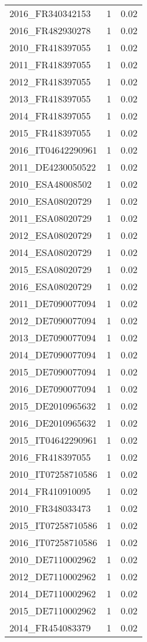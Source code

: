 \begin{table*}[htbp]
\begin{tabular}{lrr}
2016_FR340342153 & 1 & 0.02 \\
2016_FR482930278 & 1 & 0.02 \\
2010_FR418397055 & 1 & 0.02 \\
2011_FR418397055 & 1 & 0.02 \\
2012_FR418397055 & 1 & 0.02 \\
2013_FR418397055 & 1 & 0.02 \\
2014_FR418397055 & 1 & 0.02 \\
2015_FR418397055 & 1 & 0.02 \\
2016_IT04642290961 & 1 & 0.02 \\
2011_DE4230050522 & 1 & 0.02 \\
2010_ESA48008502 & 1 & 0.02 \\
2010_ESA08020729 & 1 & 0.02 \\
2011_ESA08020729 & 1 & 0.02 \\
2012_ESA08020729 & 1 & 0.02 \\
2014_ESA08020729 & 1 & 0.02 \\
2015_ESA08020729 & 1 & 0.02 \\
2016_ESA08020729 & 1 & 0.02 \\
2011_DE7090077094 & 1 & 0.02 \\
2012_DE7090077094 & 1 & 0.02 \\
2013_DE7090077094 & 1 & 0.02 \\
2014_DE7090077094 & 1 & 0.02 \\
2015_DE7090077094 & 1 & 0.02 \\
2016_DE7090077094 & 1 & 0.02 \\
2015_DE2010965632 & 1 & 0.02 \\
2016_DE2010965632 & 1 & 0.02 \\
2015_IT04642290961 & 1 & 0.02 \\
2016_FR418397055 & 1 & 0.02 \\
2010_IT07258710586 & 1 & 0.02 \\
2014_FR410910095 & 1 & 0.02 \\
2010_FR348033473 & 1 & 0.02 \\
2015_IT07258710586 & 1 & 0.02 \\
2016_IT07258710586 & 1 & 0.02 \\
2010_DE7110002962 & 1 & 0.02 \\
2012_DE7110002962 & 1 & 0.02 \\
2014_DE7110002962 & 1 & 0.02 \\
2015_DE7110002962 & 1 & 0.02 \\
2014_FR454083379 & 1 & 0.02 \\

\end{tabular}
\end{table*}
